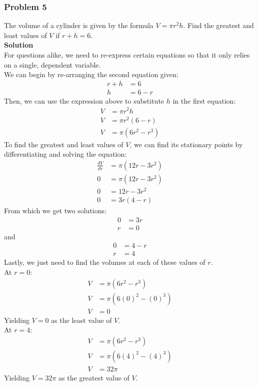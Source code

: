 \documentclass[hidelinks, a4paper, 12pt]{article}
\newcommand{\bd}{\textbf}
\newcommand{\n}{\\[\baselineskip]}
\begin{document}
            \subsubsection{Problem 5}
                The volume of a cylinder is given by the formula $V = \pi r^2h$. Find the greatest and least values of $V$ if $r + h = 6$.\n
                \bd{Solution}\n
                For questions alike, we need to re-express certain equations so that it only relies on a single, dependent variable.\n
                We can begin by re-arranging the second equation given:
                \[\begin{split}
                    r + h &= 6\\
                    h &= 6 -r
                \end{split}\]
                Then, we can use the expression above to substitute $h$ in the first equation:
                \[\begin{split}
                    V &= \pi r^2h\\
                    V &= \pi r^2 (6-r)\\
                    V &= \pi(6r^2 - r^3)
                \end{split}\]
                To find the greatest and least values of $V$, we can find its stationary points by differentiating and solving the equation:
                \[\begin{split}
                    \frac{dV}{dr} &= \pi(12r - 3r^2)\\
                    0 &= \pi(12r - 3r^2)\\
                    0 &= 12r - 3r^2\\
                    0 &= 3r(4 - r)
                \end{split}\]
                From which we get two solutions:
                \[\begin{split}
                    0 &= 3r\\
                    r &= 0
                \end{split}\]
                and
                \[\begin{split}
                    0 &= 4-r\\
                    r &= 4
                \end{split}\]
                Lastly, we just need to find the volumes at each of these values of $r$.\n
                At $r = 0$:
                \[\begin{split}
                    V &= \pi(6r^2 - r^3)\\
                    V &= \pi(6(0)^2 - (0)^3)\\
                    V &= 0
                \end{split}\]
                Yielding $V = 0$ as the least value of $V$.\n
                At $r = 4$:
                \[\begin{split}
                    V &= \pi(6r^2 - r^3)\\
                    V &= \pi(6(4)^2 - (4)^3)\\
                    V &= 32 \pi
                \end{split}\]
                Yielding $V = 32 \pi$ as the greatest value of $V$.
\end{document}

